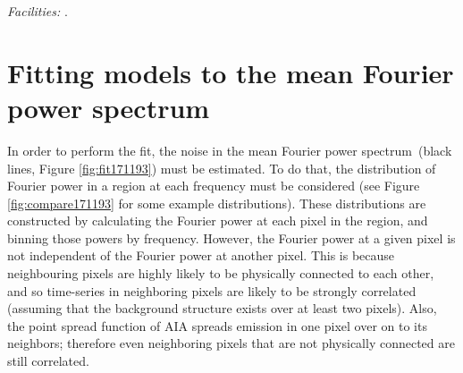 \documentclass[onecolumn]{emulateapj}
\newcommand{\PS}{power spectrum}
\newcommand{\mFps}{mean Fourier \PS}
\begin{document}


{\it Facilities:} .



\appendix

\section{Fitting models to the \mFps}\label{sec:app:ind}
In order to perform the fit, the noise in the \mFps\ (black lines,
Figure \ref{fig:fit171193}) must be estimated.  To do that, the
distribution of Fourier power in a region at each frequency must be
considered (see Figure \ref{fig:compare171193} for some example
distributions).  These distributions are constructed by calculating
the Fourier power at each pixel in the region, and binning those
powers by frequency.  However, the Fourier power at a given pixel is
not independent of the Fourier power at another pixel.  This is
because neighbouring pixels are highly likely to be physically
connected to each other, and so time-series in neighboring pixels are
likely to be strongly correlated (assuming that the background
structure exists over at least two pixels).  Also, the point spread
function of AIA spreads emission in one pixel over on to its
neighbors; therefore even neighboring pixels that are not physically
connected are still correlated.
\end{document}
